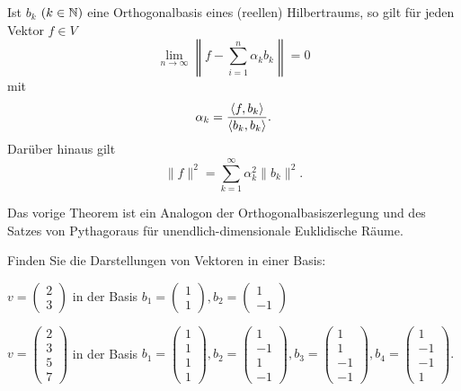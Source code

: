 \begin{thm}
	Ist $b_k$ $(k \in \mathbb{N})$ eine Orthogonalbasis eines (reellen) Hilbertraums, so gilt für jeden Vektor $f \in V$  
	\[
			\lim_{n \to \infty} \left\| f - \sum_{i=1}^n \alpha_k b_k \right\| = 0
	\]
	mit 
	\[
		\alpha_k = \frac{\left< f , b_k \right>}{\left< b_k , b_k \right>}. 
	\]
	Darüber hinaus gilt
	\[
		\|f\|^2 = \sum_{k=1}^\infty \alpha_k^2 \|b_k\|^2. 
	\]
\end{thm} 

\begin{bem}
	Das vorige Theorem ist ein Analogon der Orthogonalbasiszerlegung und des Satzes von Pythagoraus für unendlich-dimensionale Euklidische Räume. 
\end{bem} 


\begin{aufg}
	Finden  Sie die Darstellungen von Vektoren in einer Basis:  
	\begin{enuma}
		\item  $v = \begin{pmatrix} 2 \\ 3 \end{pmatrix}$ in der Basis $b_1 = \begin{pmatrix} 1 \\ 1 \end{pmatrix}, b_2 =\begin{pmatrix} 1 \\ -1 \end{pmatrix}$
		\item 
	$v = \begin{pmatrix} 2 \\ 3 \\ 5 \\ 7 \end{pmatrix}$ in der Basis 
	$
			b_1 = \begin{pmatrix} 1 \\ 1 \\ 1 \\1 \end{pmatrix}, 
			b_2 = \begin{pmatrix} 1 \\ -1 \\ 1 \\-1 \end{pmatrix},
			b_3 = \begin{pmatrix} 1 \\ 1 \\ -1 \\-1 \end{pmatrix}, 
			b_4 = \begin{pmatrix} 1 \\ -1 \\ -1 \\1 \end{pmatrix}.
	$
		\end{enuma} 
\end{aufg} 




